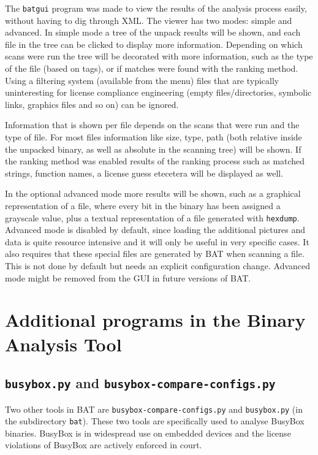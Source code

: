 \documentclass[10pt]{article}
\begin{document}
The \texttt{batgui} program was made to view the results of the analysis
process easily, without having to dig through XML. The viewer has two modes:
simple and advanced. In simple mode a tree of the unpack results will be shown,
and each file in the tree can be clicked to display more information. Depending
on which scans were run the tree will be decorated with more information, such
as the type of the file (based on tags), or if matches were found with the
ranking method. Using a filtering system (available from the menu) files that
are typically uninteresting for license compliance engineering (empty
files/directories, symbolic links, graphics files and so on) can be ignored.

Information that is shown per file depends on the scans that were run and the
type of file. For most files information like size, type, path (both relative
inside the unpacked binary, as well as absolute in the scanning tree) will be
shown. If the ranking method was enabled results of the ranking process such as
matched strings, function names, a license guess etecetera will be displayed as
well.

In the optional advanced mode more results will be shown, such as a graphical
representation of a file, where every bit in the binary has been assigned a
grayscale value, plus a textual representation of a file generated with
\texttt{hexdump}. Advanced mode is disabled by default, since loading the
additional pictures and data is quite resource intensive and it will only be
useful in very specific cases. It also requires that these special files are
generated by BAT when scanning a file. This is not done by default but needs
an explicit configuration change. Advanced mode might be removed from the GUI
in future versions of BAT.

\section{Additional programs in the Binary Analysis Tool}

\subsection{\texttt{busybox.py} and \texttt{busybox-compare-configs.py}}

Two other tools in BAT are \texttt{busybox-compare-configs.py} and
\texttt{busybox.py} (in the subdirectory \texttt{bat}). These two tools are
specifically used to analyse BusyBox binaries. BusyBox is in widespread use on
embedded devices and the license violations of BusyBox are actively enforced
in court.
\end{document}
